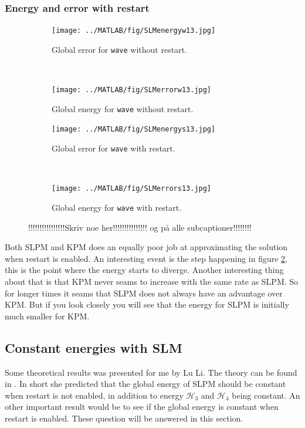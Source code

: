 \subsubsection{Energy and error with restart}%

\begin{figure}[H]
        \centering
        \begin{subfigure}[b]{0.45\textwidth}
                \texttt{[image: ../MATLAB/fig/SLMenergyw13.jpg]}
                \caption{Global error for \texttt{wave} without restart.}
                \label{fig:SLMenergyw13}
        \end{subfigure}
        ~
        \begin{subfigure}[b]{0.45\textwidth}
                \texttt{[image: ../MATLAB/fig/SLMerrorw13.jpg]}
                \caption{Global energy for \texttt{wave} without restart.}
                \label{fig:SLMerrorw13}
        \end{subfigure}
        
        \begin{subfigure}[b]{0.45\textwidth}
                \texttt{[image: ../MATLAB/fig/SLMenergys13.jpg]}
                \caption{Global error for \texttt{wave} with restart.}
                \label{fig:SLMenergys13}
        \end{subfigure}
		~
        \begin{subfigure}[b]{0.45\textwidth}
                \texttt{[image: ../MATLAB/fig/SLMerrors13.jpg]}
                \caption{Global energy for \texttt{wave} with restart.}
                \label{fig:SLMerrors13}
        \end{subfigure}
        \caption{!!!!!!!!!!!!!!!!Skriv noe her!!!!!!!!!!!!!!! og på alle subcaptioner!!!!!!!!}
        \label{fig:SLMenergyerror13}
\end{figure}

Both SLPM and KPM does an equally poor job at approximating the solution when restart is enabled. An interesting event is the step happening in figure \ref{fig:SLMerrorw13}, this is the point where the energy starts to diverge. Another interesting thing about that is that KPM never seams to increase with the same rate as SLPM. So for longer times it seams that SLPM does not always have an advantage over KPM. But if you look closely you will see that the energy for SLPM is initially much smaller for KPM.

\subsection{Constant energies with SLM} %
Some theoretical results was presented for me by Lu Li. The theory can be found in \cite{!!!!!!!!!!!!}. In short she predicted that the global energy of SLPM should be constant when restart is not enabled, in addition to energy $\mathcal{H}_3 $ and $\mathcal{H}_4$ being constant. An other important result would be to see if the global energy is constant when restart is enabled. These question will be answered in this section. 

